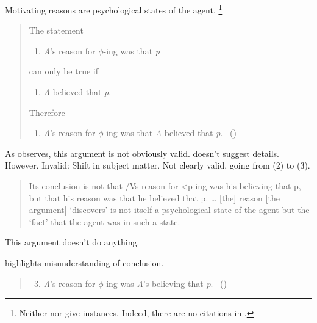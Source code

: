 \begin{note}
  Motivating reasons are psychological states of the agent.
  \citeauthor{Dancy:2000aa}%
  \footnote{
    Neither \citeauthor{Dancy:2000aa} nor \citeauthor{Collins:1997wn} give instances.
    Indeed, there are no citations in \textcite{Collins:1997wn}.
  }

  \begin{quote}
    The statement
    \begin{enumerate}[label=(\arabic*), ref=(\arabic*), nosep]
    \item%
      \emph{A}'s reason for \(\phi\)-ing was that \emph{p}
    \end{enumerate}
    can only be true if
    \begin{enumerate}[label=(\arabic*), ref=(\arabic*), resume, nosep]
    \item
      \emph{A} believed that \emph{p}.
    \end{enumerate}
    Therefore
    \begin{enumerate}[label=(\arabic*), ref=(\arabic*), resume, nosep]
    \item
      \emph{A}'s reason for \(\phi\)-ing was that \emph{A} believed that \emph{p}.%
      \mbox{ }\hfill\mbox{(\citeyear[102]{Dancy:2000aa})}
    \end{enumerate}
  \end{quote}

  As \citeauthor{Dancy:2000aa} observes, this argument is not obviously valid.
  \citeauthor{Dancy:2000aa} doesn't suggest details.
  However.
  Invalid: Shift in subject matter.
  Not clearly valid, going from (2) to (3).

  \begin{quote}
    Its conclusion is not that /Vs reason for <p-ing was his believing that p, but that his reason was that he believed that p.
    \dots
    [the] reason [the argument] ‘discovers’ is not itself a psychological state of the agent but the ‘fact’ that the agent was in such a state.
  \end{quote}

  This argument doesn't do anything.

  \citeauthor{Dancy:2000aa} highlights misunderstanding of conclusion.

  \begin{quote}
    \begin{enumerate}[label=(\arabic*\(^{\ast}\)), ref=(\arabic*\(^{\ast}\))]
      \setcounter{enumi}{2}
    \item
      \emph{A}'s reason for \(\phi\)-ing was \emph{A}'s believing that \emph{p}.%
      \mbox{ }\hfill\mbox{(\citeyear[102]{Dancy:2000aa})}
    \end{enumerate}
  \end{quote}


\end{note}
